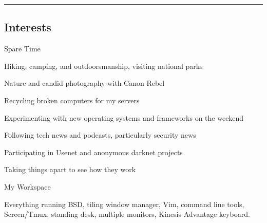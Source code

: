 \documentclass[10pt,letterpaper]{article}
\begin{document}
\hrule
\vspace{-0.4em}
\subsection*{Interests}
\begin{itemize*}
    \item Spare Time
        \begin{itemize*}
            \item Hiking, camping, and outdoorsmanship, visiting national parks
            \item Nature and candid photography with Canon Rebel
            \item Recycling broken computers for my servers
            \item Experimenting with new operating systems and frameworks on the
                weekend
            \item Following tech news and podcasts, particularly security news
            \item Participating in Usenet and anonymous darknet projects
            \item Taking things apart to see how they work
        \end{itemize*}
    \item My Workspace
        \begin{itemize*}
            \item Everything running BSD, tiling window manager, Vim, command
                line tools, Screen/Tmux, standing desk, multiple monitors,
                Kinesis Advantage keyboard.
        \end{itemize*}
\end{itemize*}
\end{document}
